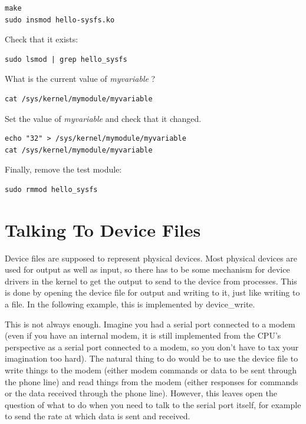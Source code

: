 \documentclass[11pt]{article}
\begin{document}
\begin{verbatim}
make
sudo insmod hello-sysfs.ko
\end{verbatim}

Check that it exists:

\begin{verbatim}
sudo lsmod | grep hello_sysfs
\end{verbatim}

What is the current value of \emph{myvariable} ?

\begin{verbatim}
cat /sys/kernel/mymodule/myvariable
\end{verbatim}

Set the value of \emph{myvariable} and check that it changed.

\begin{verbatim}
echo "32" > /sys/kernel/mymodule/myvariable
cat /sys/kernel/mymodule/myvariable
\end{verbatim}

Finally, remove the test module:

\begin{verbatim}
sudo rmmod hello_sysfs
\end{verbatim}

\section*{Talking To Device Files}
\label{sec-9}
Device files are supposed to represent physical devices. Most physical devices are used for output as well as input, so there has to be some mechanism for device drivers in the kernel to get the output to send to the device from processes. This is done by opening the device file for output and writing to it, just like writing to a file. In the following example, this is implemented by device\_write.

This is not always enough. Imagine you had a serial port connected to a modem (even if you have an internal modem, it is still implemented from the CPU's perspective as a serial port connected to a modem, so you don't have to tax your imagination too hard). The natural thing to do would be to use the device file to write things to the modem (either modem commands or data to be sent through the phone line) and read things from the modem (either responses for commands or the data received through the phone line). However, this leaves open the question of what to do when you need to talk to the serial port itself, for example to send the rate at which data is sent and received.
\end{document}
